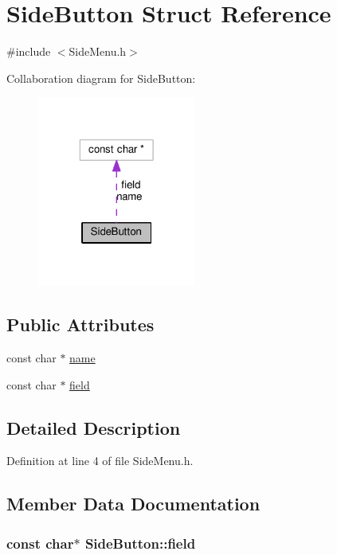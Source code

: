 \hypertarget{struct_side_button}{\section{Side\-Button Struct Reference}
\label{struct_side_button}
}


{\ttfamily \#include $<$Side\-Menu.\-h$>$}



Collaboration diagram for Side\-Button\-:
\nopagebreak
\begin{figure}[H]
\begin{center}
\leavevmode
\includegraphics[width=148pt]{struct_side_button__coll__graph}
\end{center}
\end{figure}
\subsection*{Public Attributes}
\begin{DoxyCompactItemize}
\item 
const char $\ast$ \hyperlink{struct_side_button_a2533e6acfd5ba40cb7717412c25e6a0c}{name}
\item 
const char $\ast$ \hyperlink{struct_side_button_afd703657d0b75b20a7ca1d2c3147ec34}{field}
\end{DoxyCompactItemize}


\subsection{Detailed Description}


Definition at line 4 of file Side\-Menu.\-h.



\subsection{Member Data Documentation}
\hypertarget{struct_side_button_afd703657d0b75b20a7ca1d2c3147ec34}{
\subsubsection[{field}]{\setlength{\rightskip}{0pt plus 5cm}const char$\ast$ Side\-Button\-::field}}\label{struct_side_button_afd703657d0b75b20a7ca1d2c3147ec34}



